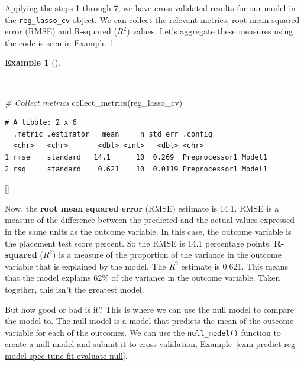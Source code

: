 \documentclass[
  letterpaper,
  krantz1]{latex/krantz-mod}
\newenvironment{Shaded}{\begin{snugshade}}{\end{snugshade}}
\newcommand{\CommentTok}[1]{\textcolor[rgb]{0.00,0.00,0.00}{\textit{#1}}}
\newcommand{\FunctionTok}[1]{\textcolor[rgb]{0.00,0.00,0.00}{#1}}
\newcommand{\NormalTok}[1]{\textcolor[rgb]{0.00,0.00,0.00}{#1}}
\newcommand{\cindex}[1]{%
  \StrSubstitute{#1}{_}{\_}[\temp]%
  \index{\temp}%
}
\theoremstyle{definition}
\theoremstyle{definition}
\newtheorem{example}{Example}[chapter]
\theoremstyle{remark}
\begin{document}
Applying the steps 1 through 7, we have
cross-validated results for our model in
the \texttt{reg\_lasso\_cv} object. We can collect the relevant metrics,
root mean squared error (RMSE) and
R-squared (\(R^2\)) values. Let's aggregate these
measures using the code is seen in
Example~\ref{exm-predict-reg-metrics-lasso}.

\begin{example}[]\protect\hypertarget{exm-predict-reg-metrics-lasso}{}\label{exm-predict-reg-metrics-lasso}

~

\begin{Shaded}
\begin{Highlighting}[numbers=left,,]
\CommentTok{\# Collect metrics}
\FunctionTok{collect\_metrics}\NormalTok{(reg\_lasso\_cv)}
\end{Highlighting}
\end{Shaded}

\begin{verbatim}
# A tibble: 2 x 6
  .metric .estimator   mean     n std_err .config             
  <chr>   <chr>       <dbl> <int>   <dbl> <chr>               
1 rmse    standard   14.1      10  0.269  Preprocessor1_Model1
2 rsq     standard    0.621    10  0.0119 Preprocessor1_Model1
\end{verbatim}

 \cindex{collect_metrics()}

\end{example}

Now, the \textbf{root mean squared error}
(RMSE) estimate is 14.1. RMSE is a
measure of the difference between the predicted and the actual values
expressed in the same units as the outcome variable. In this case, the
outcome variable is the placement test score percent. So the RMSE is
14.1 percentage points. \textbf{R-squared} (\(R^2\)) is
a measure of the proportion of the variance in the outcome variable that
is explained by the model. The \(R^2\) estimate is 0.621. This means
that the model explains 62\% of the variance in the outcome variable.
Taken together, this isn't the greatest model.

But how good or bad is it? This is where we can use the null model to
compare the model to. The null model is a model that
predicts the mean of the outcome variable for each of the outcomes. We
can use the \texttt{null\_model()} function to create a null model and
submit it to cross-validation,
Example~\ref{exm-predict-reg-model-spec-tune-fit-evaluate-null}.
\end{document}
